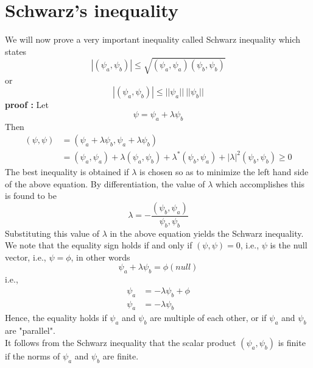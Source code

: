 \section{Schwarz's inequality}
We will now prove a very important inequality called Schwarz inequality which states
\begin{equation}\label{eqn:2.56}
|(\psi_a, \psi_b)| \leq \sqrt{(\psi_a, \psi_a)(\psi_b, \psi_b)}
\end{equation}
or
\begin{equation}\label{eqn:2.57}
|(\psi_a, \psi_b)| \leq ||\psi_a ||\ ||\psi_b||
\end{equation}
\textbf{proof : }
Let
\begin{equation}\label{eqn:2.58}
\psi = \psi_a + \lambda \psi_b
\end{equation}
Then
\begin{eqnarray}\label{eqn:2.59-2.60}
	(\psi, \psi) &= (\psi_a + \lambda \psi_b, \psi_a + \lambda \psi_b) \\
	&= (\psi_a, \psi_a) + \lambda (\psi_a, \psi_b) + \lambda^* (\psi_b, \psi_a) + |\lambda|^2 (\psi_b, \psi_b) \geq 0
\end{eqnarray}
The best inequality is obtained if $\lambda$ is chosen so as to minimize the left hand side of the above equation. By differentiation, the value of $\lambda$ which accomplishes this is found to be
\begin{equation}\label{eqn:2.61}
\lambda = - \frac{(\psi_b, \psi_a)}{\psi_b, \psi_b}
\end{equation}
Substituting this value of $\lambda$ in the above equation yields the Schwarz inequality.\\

We note that the equality sign holds if and only if $(\psi, \psi) = 0$, i.e., $\psi$ is the null vector, i.e., $\psi = \phi$, in other words
\begin{equation}\label{eqn:2.62}
\psi_a + \lambda \psi_b = \phi (null)
\end{equation}
i.e.,
\begin{eqnarray}\label{eqn:2.63-2.64}
	\psi_a &= - \lambda \psi_b + \phi \\
	\psi_a &= -\lambda \psi_b
\end{eqnarray}
Hence, the equality holds if $\psi_a$ and $\psi_b$ are multiple of each other, or if $\psi_a$ and $\psi_b$ are "parallel".\\
It follows from the Schwarz inequality that the scalar product $(\psi_a, \psi_b)$ is finite if the norms of $\psi_a$ and $\psi_b$ are finite.

